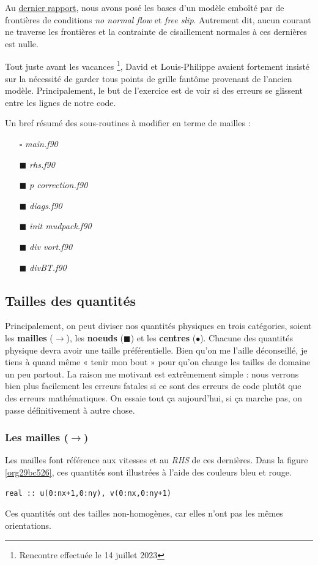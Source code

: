 \documentclass[10pt]{article}
\numberwithin{equation}{section}
\renewcommand{\boxtimes}{\blacksquare}
\begin{document}
Au \href{rapport-2023-07-07.org}{dernier rapport}, nous avons posé les bases d'un modèle emboîté par de frontières de conditions \emph{no normal flow} et \emph{free slip}.
Autrement dit, aucun courant ne traverse les frontières et la contrainte de cisaillement normales à ces dernières est nulle. \bigskip

Tout juste avant les vacances \footnote{Rencontre effectuée le 14 juillet 2023}, David et Louis-Philippe avaient fortement insisté sur la nécessité de garder tous points de grille fantôme provenant de l'ancien modèle.
Principalement, le but de l'exercice est de voir si des erreurs se glissent entre les lignes de notre code. \bigskip

Un bref résumé des sous-routines à modifier en terme de mailles : 
\begin{itemize}
\item[{$\square$}] \emph{main.f90}
\item[{$\boxtimes$}] \emph{rhs.f90}
\item[{$\boxtimes$}] \emph{p correction.f90}
\item[{$\boxtimes$}] \emph{diags.f90}
\item[{$\boxtimes$}] \emph{init mudpack.f90}
\item[{$\boxtimes$}] \emph{div vort.f90}
\item[{$\boxtimes$}] \emph{divBT.f90}
\end{itemize}


\subsection{Tailles des quantités}
\label{sec:org3cd5c34}
Principalement, on peut diviser nos quantités physiques en trois catégories, soient les \textbf{mailles} (\(\rightarrow\)), les \textbf{noeuds} (\(\blacksquare\)) et les \textbf{centres} (\(\bullet\)).
Chacune des quantités physique devra avoir une taille préférentielle.
Bien qu'on me l'aille déconseillé, je tiens à quand même « tenir mon bout » pour qu'on change les tailles de domaine un peu partout.
La raison me motivant est extrêmement simple : nous verrons bien plus facilement les erreurs fatales si ce sont des erreurs de code plutôt que des erreurs mathématiques.
On essaie tout ça aujourd'hui, si ça marche pas, on passe définitivement à autre chose.

\subsubsection{Les mailles (\(\rightarrow\))}
\label{sec:org893bafc}
Les mailles font référence aux vitesses et au \emph{RHS} de ces dernières. 
Dans la figure \ref{org29bc526}, ces quantités sont illustrées à l'aide des couleurs bleu et rouge.
\begin{verbatim}
real :: u(0:nx+1,0:ny), v(0:nx,0:ny+1)
\end{verbatim}
Ces quantités ont des tailles non-homogènes, car elles n'ont pas les mêmes orientations.
\end{document}
